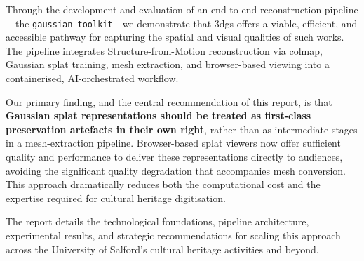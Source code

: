 \documentclass[a4paper,11pt,twoside,openright]{report}
\begin{document}
Through the development and evaluation of an end-to-end reconstruction pipeline---the \texttt{gaussian-toolkit}---we demonstrate that \acrshort{3dgs} offers a viable, efficient, and accessible pathway for capturing the spatial and visual qualities of such works. The pipeline integrates Structure-from-Motion reconstruction via \acrshort{colmap}, Gaussian splat training, mesh extraction, and browser-based viewing into a containerised, AI-orchestrated workflow.

Our primary finding, and the central recommendation of this report, is that \textbf{Gaussian splat representations should be treated as first-class preservation artefacts in their own right}, rather than as intermediate stages in a mesh-extraction pipeline. Browser-based splat viewers now offer sufficient quality and performance to deliver these representations directly to audiences, avoiding the significant quality degradation that accompanies mesh conversion. This approach dramatically reduces both the computational cost and the expertise required for cultural heritage digitisation.

The report details the technological foundations, pipeline architecture, experimental results, and strategic recommendations for scaling this approach across the University of Salford's cultural heritage activities and beyond.

\tableofcontents
\listoffigures
\listoftables

\printglossary[type=\acronymtype, title={Acronyms and Abbreviations}]

\cleardoublepage
{}










\cleardoublepage
\printbibliography[heading=bibintoc, title={References}]

\appendix



\printindex
\end{document}
